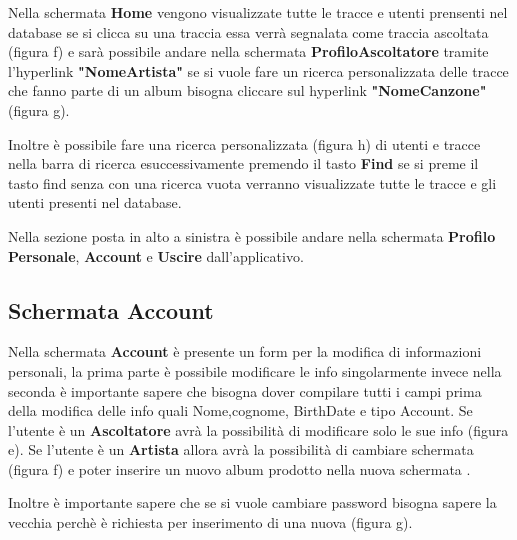 \documentclass[11pt]{article}
\begin{document}
	Nella schermata \textbf{Home} vengono visualizzate tutte le tracce e utenti prensenti nel database se si clicca su una traccia
	essa verrà segnalata come traccia ascoltata (figura f) e sarà possibile andare nella schermata \textbf{ProfiloAscoltatore} tramite
	l'hyperlink \textbf{"NomeArtista"} se si vuole fare un ricerca personalizzata delle tracce che fanno parte di un album bisogna cliccare
	sul hyperlink  \textbf{"NomeCanzone"} (figura g).
	\begin{figure}[h]
		\centering
		
	\end{figure}
	Inoltre è possibile fare una ricerca personalizzata (figura h) di utenti e tracce nella barra di ricerca esuccessivamente premendo il tasto \textbf{Find}
	se si preme il tasto find senza con una ricerca vuota verranno visualizzate tutte le tracce e gli utenti presenti nel database.
	\begin{figure}[h]
		\centering
	\end{figure}
	Nella sezione posta in alto a sinistra è possibile andare nella schermata \textbf{Profilo Personale}, \textbf{Account} e \textbf{Uscire} dall'applicativo.

	\clearpage
	\subsection{Schermata Account}

	Nella schermata \textbf{Account} è presente un form per la modifica di informazioni personali, la prima parte è possibile modificare le info singolarmente 
	invece nella seconda è importante sapere che bisogna dover compilare tutti i campi prima della modifica delle info quali Nome,cognome, BirthDate e tipo Account. 
	Se l'utente è un \textbf{Ascoltatore} avrà la possibilità di modificare solo le sue info (figura e).
	Se l'utente è un \textbf{Artista} allora avrà la possibilità di cambiare schermata (figura f) e poter inserire un nuovo album prodotto nella nuova schermata .
	
	
	\begin{figure}[h]
		\centering
		
	\end{figure}
	Inoltre è importante sapere che se si vuole cambiare password bisogna sapere la vecchia perchè è richiesta per inserimento di una nuova (figura g).
	\begin{figure}
		\centering
	\end{figure}
\end{document}
